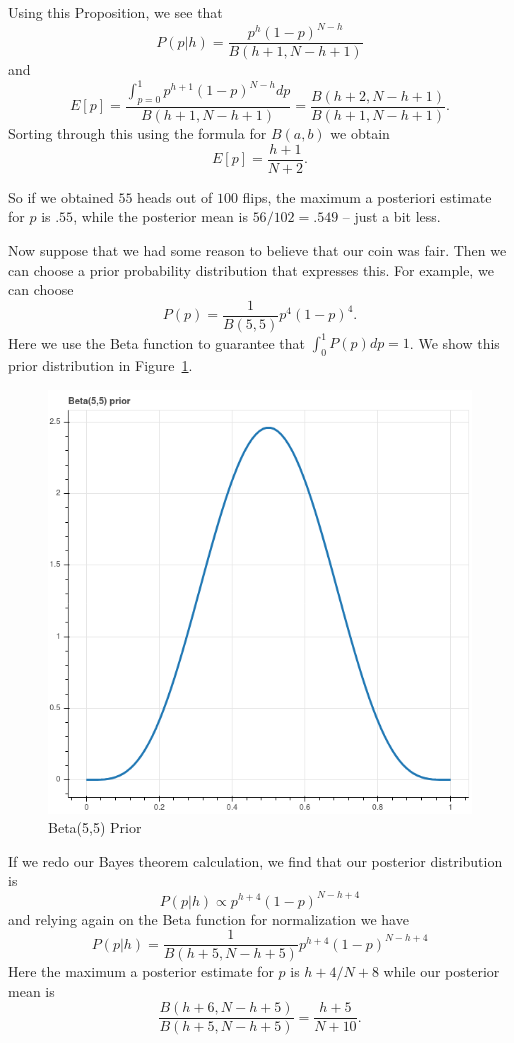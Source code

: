 \documentclass[
  11pt,
  letterpaper,
]{scrbook}
\theoremstyle{plain}
\theoremstyle{plain}
\theoremstyle{remark}
\begin{document}
Using this Proposition, we see that \[
P(p|h) = \frac{p^{h}(1-p)^{N-h}}{B(h+1,N-h+1)}
\] and \[
E[p] = \frac{\int_{p=0}^{1} p^{h+1}(1-p)^{N-h}dp}{B(h+1,N-h+1)}=\frac{B(h+2,N-h+1)}{B(h+1,N-h+1)}.
\] Sorting through this using the formula for \(B(a,b)\) we obtain \[
E[p]=\frac{h+1}{N+2}.
\]

So if we obtained \(55\) heads out of \(100\) flips, the maximum a
posteriori estimate for \(p\) is \(.55\), while the posterior mean is
\(56/102=.549\) -- just a bit less.

Now suppose that we had some reason to believe that our coin was fair.
Then we can choose a prior probability distribution that expresses this.
For example, we can choose \[
P(p) = \frac{1}{B(5,5)}p^{4}(1-p)^{4}.
\] Here we use the Beta function to guarantee that
\(\int_{0}^{1}P(p)dp=1\). We show this prior distribution in
Figure~\ref{fig-betaprior}.

\begin{figure}

{\centering \includegraphics{chapters/img/betaprior.png}

}

\caption{\label{fig-betaprior}Beta(5,5) Prior}

\end{figure}

If we redo our Bayes theorem calculation, we find that our posterior
distribution is \[
P(p|h) \propto p^{h+4}(1-p)^{N-h+4}
\] and relying again on the Beta function for normalization we have \[
P(p|h) = \frac{1}{B(h+5,N-h+5)}p^{h+4}(1-p)^{N-h+4}
\] Here the maximum a posterior estimate for \(p\) is \(h+4/N+8\) while
our posterior mean is \[
\frac{B(h+6,N-h+5)}{B(h+5,N-h+5)} = \frac{h+5}{N+10}.
\]
\end{document}

